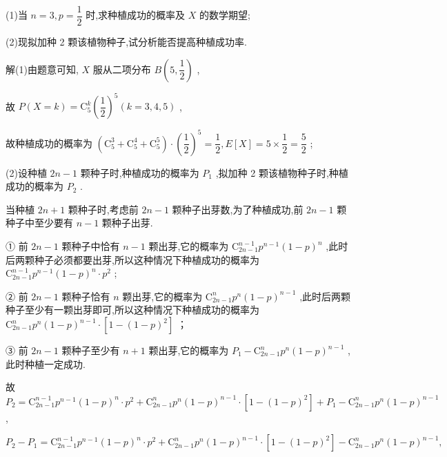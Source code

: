 (1)当 $n = 3,p = \dfrac{1}{2}$ 时,求种植成功的概率及 $X$ 的数学期望;

(2)现拟加种 2 颗该植物种子,试分析能否提高种植成功率.

解(1)由题意可知, $X$ 服从二项分布 $B\left( {5,\dfrac{1}{2}}\right)$ ,

故 $P\left( {X = k}\right)  = {\mathrm{C}}_{5}^{k}{\left( \dfrac{1}{2}\right) }^{5}\left( {k = 3,4,5}\right)$ ,

故种植成功的概率为 $\left( {{\mathrm{C}}_{5}^{3} + {\mathrm{C}}_{5}^{4} + {\mathrm{C}}_{5}^{5}}\right)  \cdot  {\left( \dfrac{1}{2}\right) }^{5} = \dfrac{1}{2},E\left\lbrack  X\right\rbrack   = 5 \times  \dfrac{1}{2} = \dfrac{5}{2}$ ;

(2)设种植 ${2n} - 1$ 颗种子时,种植成功的概率为 ${P}_{1}$ ,拟加种 2 颗该植物种子时,种植成功的概率为 ${P}_{2}$ .

当种植 ${2n} + 1$ 颗种子时,考虑前 ${2n} - 1$ 颗种子出芽数,为了种植成功,前 ${2n} - 1$ 颗种子中至少要有 $n - 1$ 颗种子出芽.

① 前 ${2n} - 1$ 颗种子中恰有 $n - 1$ 颗出芽,它的概率为 ${\mathrm{C}}_{{2n} - 1}^{n - 1}{p}^{n - 1}{\left( 1 - p\right) }^{n}$ ,此时后两颗种子必须都要出芽,所以这种情况下种植成功的概率为 ${\mathrm{C}}_{{2n} - 1}^{n - 1}{p}^{n - 1}{\left( 1 - p\right) }^{n} \cdot  {p}^{2}$ ;

② 前 ${2n} - 1$ 颗种子恰有 $n$ 颗出芽,它的概率为 ${\mathrm{C}}_{{2n} - 1}^{n}{p}^{n}{\left( 1 - p\right) }^{n - 1}$ ,此时后两颗种子至少有一颗出芽即可,所以这种情况下种植成功的概率为 ${\mathrm{C}}_{{2n} - 1}^{n}{p}^{n}{\left( 1 - p\right) }^{n - 1} \cdot  \left\lbrack  {1 - {\left( 1 - p\right) }^{2}}\right\rbrack$ ；

③ 前 ${2n} - 1$ 颗种子至少有 $n + 1$ 颗出芽,它的概率为 ${P}_{1} - {\mathrm{C}}_{{2n} - 1}^{n}{p}^{n}{\left( 1 - p\right) }^{n - 1}$ ,此时种植一定成功.

故 ${P}_{2} = {\mathrm{C}}_{{2n} - 1}^{n - 1}{p}^{n - 1}{\left( 1 - p\right) }^{n} \cdot  {p}^{2} + {\mathrm{C}}_{{2n} - 1}^{n}{p}^{n}{\left( 1 - p\right) }^{n - 1} \cdot  \left\lbrack  {1 - {\left( 1 - p\right) }^{2}}\right\rbrack   + {P}_{1} - {\mathrm{C}}_{{2n} - 1}^{n}{p}^{n}{\left( 1 - p\right) }^{n - 1}$ ,

${P}_{2} - {P}_{1} = {\mathrm{C}}_{{2n} - 1}^{n - 1}{p}^{n - 1}{\left( 1 - p\right) }^{n} \cdot  {p}^{2} + {\mathrm{C}}_{{2n} - 1}^{n}{p}^{n}{\left( 1 - p\right) }^{n - 1} \cdot  \left\lbrack  {1 - {\left( 1 - p\right) }^{2}}\right\rbrack   - {\mathrm{C}}_{{2n} - 1}^{n}{p}^{n}{\left( 1 - p\right) }^{n - 1},$

